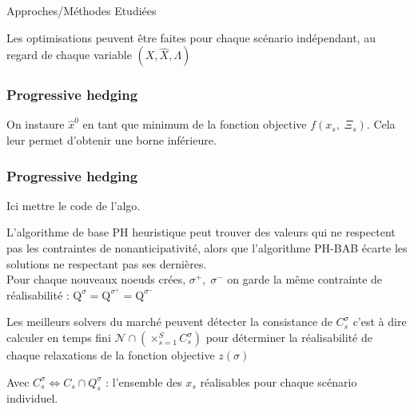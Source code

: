 \documentclass[10pt]{beamer}
\begin{document}
\begin{section}{Approches/Méthodes Etudiées}
    \begin{frame}
        Les optimisations peuvent être faites pour chaque scénario indépendant, au regard de chaque variable $(X, \hat{X}, \Lambda)$
    \end{frame}
    
    
    
    \begin{frame}
        \frametitle{Progressive hedging}
        On instaure $\hat{x}^0$ en tant que minimum de la fonction objective $f(x_s, \; \Xi_s)$. Cela leur permet d'obtenir une borne inférieure.
        
    \end{frame}
    
    \begin{frame}
        \frametitle{Progressive hedging}
         Ici mettre le code de l'algo.
        
        
    \end{frame}
    
    \begin{frame}
       L'algorithme de base PH heuristique peut trouver des valeurs qui ne respectent pas les contraintes de nonanticipativité, alors que l'algorithme PH-BAB écarte les solutions ne respectant pas ses dernières.\\
       Pour chaque nouveaux noeuds crées, $\sigma^+,\;\sigma^-$ on garde la même contrainte de réalisabilité : $\mathrm{Q}^\sigma = \mathrm{Q}^{\sigma^+} = \mathrm{Q}^{\sigma^-}$
    \end{frame}
    
    \begin{frame}
      Les meilleurs solvers du marché peuvent détecter la consistance de $C_s^\sigma$ c'est à dire calculer en temps fini 
      $\mathcal{N}\cap(\times_{s = 1}^S C_s^\sigma)$ pour déterminer la réalisabilité de chaque relaxations de la fonction objective $z(\sigma)$
      
      Avec $C_s^\sigma \Leftrightarrow C_s \cap Q_s^\sigma$ : l'ensemble des $x_s$ réalisables pour chaque scénario individuel.
    \end{frame}
    \end{section}
    
\end{document}

